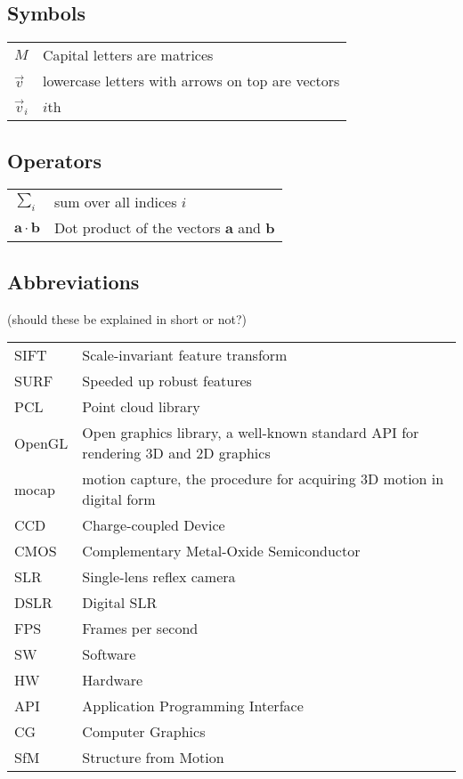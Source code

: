 
\subsection*{Symbols}

\begin{tabular}{ll}
$M$	& Capital letters are matrices\\
$\vec v$	& lowercase letters with arrows on top are vectors\\
$\vec v_i$	& $i$th 
\end{tabular}


\subsection*{Operators}

\begin{tabular}{ll}
$\sum_i $                        & sum over all indices $i$\\
$\mathbf{a} \cdot \mathbf{b}$    & Dot product of the vectors $\mathbf{a}$ and $\mathbf{b}$
\end{tabular}

\subsection*{Abbreviations}

(should these be explained in short or not?)

\begin{tabular}{ll}
	SIFT & Scale-invariant feature transform\\
	SURF & Speeded up robust features \\
	PCL & Point cloud library\\
	OpenGL & Open graphics library, a well-known standard API for rendering 3D and 2D graphics\\
	mocap & motion capture, the procedure for acquiring 3D motion in digital form\\
	CCD & Charge-coupled Device\\
	CMOS & Complementary Metal-Oxide Semiconductor\\
	SLR & Single-lens reflex camera\\
	DSLR & Digital SLR\\
	FPS & Frames per second\\
	SW & Software\\
	HW & Hardware\\
	API & Application Programming Interface\\
	CG & Computer Graphics\\
	SfM & Structure from Motion\\
\end{tabular}

